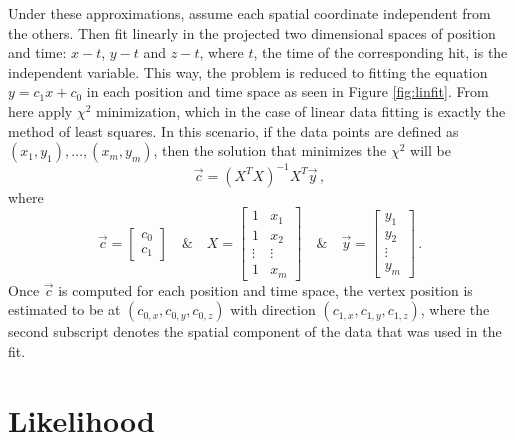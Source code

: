 Under these approximations, assume each spatial coordinate independent from the others. Then fit linearly in the projected two dimensional spaces of position and time: $x-t$, $y-t$ and $z-t$, where $t$, the time of the corresponding hit, is the independent variable. This way, the problem is reduced to fitting the equation $y=c_{1}x + c_{0}$ in each position and time space as seen in Figure \ref{fig:linfit}. From here apply $\chi^{2}$ minimization, which in the case of linear data fitting is exactly the method of least squares. In this scenario, if the data points are defined as $(x_{1},y_{1}), \dots, (x_{m},y_{m})$, then the solution that minimizes the $\chi^{2}$ will be
\begin{equation}
  \vec{c} = (X^{T}X)^{-1}X^{T}\vec{y}\, ,
\end{equation}
where
\begin{equation}
  \vec{c} =
  \begin{bmatrix}
    c_{0} \\
    c_{1}
  \end{bmatrix}
  \quad \& \quad
  X =
  \begin{bmatrix}
    1 & x_{1} \\
    1 & x_{2} \\
    \vdots & \vdots \\
    1 & x_{m}
  \end{bmatrix}
  \quad \& \quad
  \vec{y} = 
  \begin{bmatrix}
    y_{1} \\
    y_{2} \\
    \vdots \\
    y_{m}
  \end{bmatrix}\, .
\end{equation}
Once $\vec{c}$ is computed for each position and time space, the vertex position is estimated to be at $(c_{0,x}, c_{0,y}, c_{0,z})$ with direction $(c_{1,x}, c_{1,y}, c_{1,z})$, where the second subscript denotes the spatial component of the data that was used in the fit. 

\section{Likelihood}


